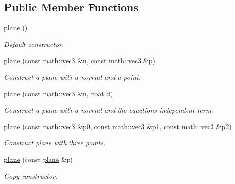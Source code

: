 \subsection*{Public Member Functions}
\begin{DoxyCompactItemize}
\item 
\mbox{\label{classphysim_1_1geom_1_1plane_a64a0fa202286b9e8649829f98e5d3a1e}} 
\hyperlink{classphysim_1_1geom_1_1plane_a64a0fa202286b9e8649829f98e5d3a1e}{plane} ()
\begin{DoxyCompactList}\small\item\em Default constructor. \end{DoxyCompactList}\item 
\hyperlink{classphysim_1_1geom_1_1plane_aeb026d0e17e529a5709fb833e3c0f2a0}{plane} (const \hyperlink{structphysim_1_1math_1_1vec3}{math\+::vec3} \&n, const \hyperlink{structphysim_1_1math_1_1vec3}{math\+::vec3} \&p)
\begin{DoxyCompactList}\small\item\em Construct a plane with a normal and a point. \end{DoxyCompactList}\item 
\hyperlink{classphysim_1_1geom_1_1plane_aaf64dcf023556f15e3705fa0269a2675}{plane} (const \hyperlink{structphysim_1_1math_1_1vec3}{math\+::vec3} \&n, float d)
\begin{DoxyCompactList}\small\item\em Construct a plane with a normal and the equation\textquotesingle{}s independent term. \end{DoxyCompactList}\item 
\hyperlink{classphysim_1_1geom_1_1plane_a2dd759ec4519cfd2fb943bda36988f9a}{plane} (const \hyperlink{structphysim_1_1math_1_1vec3}{math\+::vec3} \&p0, const \hyperlink{structphysim_1_1math_1_1vec3}{math\+::vec3} \&p1, const \hyperlink{structphysim_1_1math_1_1vec3}{math\+::vec3} \&p2)
\begin{DoxyCompactList}\small\item\em Construct plane with three points. \end{DoxyCompactList}\item 
\mbox{\label{classphysim_1_1geom_1_1plane_a9446a32f619c01e87b122ee84736dfd2}} 
\hyperlink{classphysim_1_1geom_1_1plane_a9446a32f619c01e87b122ee84736dfd2}{plane} (const \hyperlink{classphysim_1_1geom_1_1plane}{plane} \&p)
\begin{DoxyCompactList}\small\item\em Copy constructor. \end{DoxyCompactList}\item 

\end{DoxyCompactItemize}
